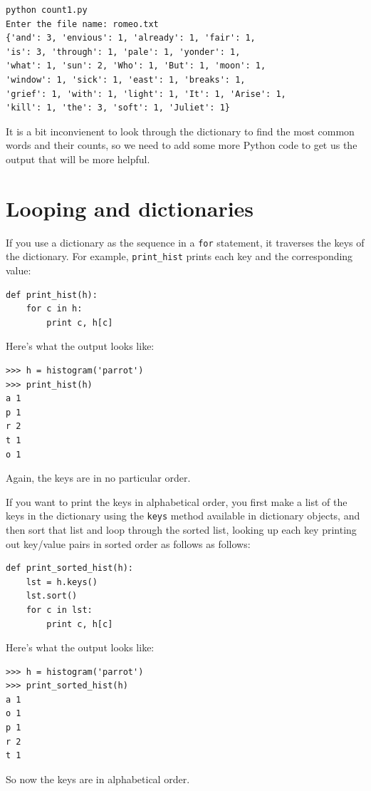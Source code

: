 \documentclass[10pt]{book}
\begin{document}
\beforeverb
\begin{verbatim}
python count1.py 
Enter the file name: romeo.txt
{'and': 3, 'envious': 1, 'already': 1, 'fair': 1, 
'is': 3, 'through': 1, 'pale': 1, 'yonder': 1, 
'what': 1, 'sun': 2, 'Who': 1, 'But': 1, 'moon': 1, 
'window': 1, 'sick': 1, 'east': 1, 'breaks': 1, 
'grief': 1, 'with': 1, 'light': 1, 'It': 1, 'Arise': 1, 
'kill': 1, 'the': 3, 'soft': 1, 'Juliet': 1}
\end{verbatim}
\afterverb
%
It is a bit inconvienent to look through the dictionary to find the
most common words and their counts, so we need to add some more 
Python code to get us the output that will be more helpful.

\section{Looping and dictionaries}


If you use a dictionary as the sequence 
in a {\tt for} statement, it traverses
the keys of the dictionary.  For example, \verb"print_hist"
prints each key and the corresponding value:

\beforeverb
\begin{verbatim}
def print_hist(h):
    for c in h:
        print c, h[c]
\end{verbatim}
\afterverb
%
Here's what the output looks like:

\beforeverb
\begin{verbatim}
>>> h = histogram('parrot')
>>> print_hist(h)
a 1
p 1
r 2
t 1
o 1
\end{verbatim}
\afterverb
%
Again, the keys are in no particular order.

If you want to print the keys in alphabetical order, you first 
make a list of the keys in the dictionary using the 
{\tt keys} method available in dictionary objects,
and then sort that list
and loop through the sorted list, looking up each
key printing out key/value pairs in sorted order as follows
as follows:

\beforeverb
\begin{verbatim}
def print_sorted_hist(h):
    lst = h.keys()
    lst.sort()
    for c in lst:
        print c, h[c]
\end{verbatim}
\afterverb
%
Here's what the output looks like:

\beforeverb
\begin{verbatim}
>>> h = histogram('parrot')
>>> print_sorted_hist(h)
a 1
o 1
p 1
r 2
t 1
\end{verbatim}
\afterverb
%
So now the keys are in alphabetical order.
\end{document}
